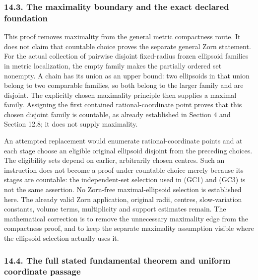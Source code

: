 \documentclass[
  11pt,
]{article}
\begin{document}
\subsubsection{14.3. The maximality boundary and the exact declared
foundation}\label{the-maximality-boundary-and-the-exact-declared-foundation}

This proof removes maximality from the general metric compactness route.
It does not claim that countable choice proves the separate general Zorn
statement. For the actual collection of pairwise disjoint fixed-radius
frozen ellipsoid families in metric localization, the empty family makes
the partially ordered set nonempty. A chain has its union as an upper
bound: two ellipsoids in that union belong to two comparable families,
so both belong to the larger family and are disjoint. The explicitly
chosen maximality principle then supplies a maximal family. Assigning
the first contained rational-coordinate point proves that this chosen
disjoint family is countable, as already established in Section 4 and
Section 12.8; it does not supply maximality.

An attempted replacement would enumerate rational-coordinate points and
at each stage choose an eligible original ellipsoid disjoint from the
preceding choices. The eligibility sets depend on earlier, arbitrarily
chosen centres. Such an instruction does not become a proof under
countable choice merely because its stages are countable: the
independent-set selection used in (GC1) and (GC3) is not the same
assertion. No Zorn-free maximal-ellipsoid selection is established here.
The already valid Zorn application, original radii, centres,
slow-variation constants, volume terms, multiplicity and support
estimates remain. The mathematical correction is to remove the
unnecessary maximality edge from the compactness proof, and to keep the
separate maximality assumption visible where the ellipsoid selection
actually uses it.

\subsubsection{14.4. The full stated fundamental theorem and uniform
coordinate
passage}\label{the-full-stated-fundamental-theorem-and-uniform-coordinate-passage}
\end{document}
